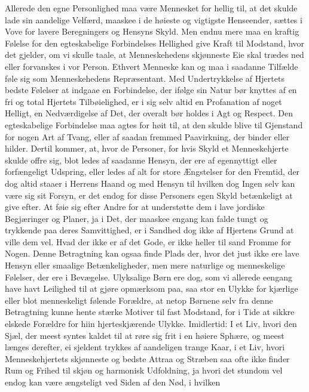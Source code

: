 \documentclass[12pt,a4paper]{book}
\newcommand{\apage}[1]{\marginnote{\footnotesize\textit{[#1]}}}
\begin{document}
Allerede den egne Personlighed maa være Mennesket for hellig til, at det
skulde lade sin aandelige Velfærd, maaskee i de høieste og vigtigste
Henseender, sættes i Vove for lavere Beregningers og Hensyns Skyld. Men
endnu mere maa en kraftig Følelse for \apage{152} den egteskabelige Forbindelses
Hellighed give Kraft til Modstand, hvor det gjelder, om vi skulle taale,
at Menneskehedens skjønneste Eie skal trædes ned eller forvanskes i vor
Person. Ethvert Menneske kan og maa i saadanne Tilfælde føle sig som
Menneskehedens Repræsentant.
Med Undertrykkelse af Hjertets bedste Følelser at indgaae en Forbindelse,
der ifølge sin Natur bør knyttes af en fri og total Hjertets
Tilbøielighed, er i sig selv altid en Profanation af noget Helligt, en
Nedværdigelse af Det, der overalt bør holdes i Agt og Respect. Den
egteskabelige Forbindelse maa agtes for høit til, at den skulde blive til
Gjenstand for nogen Art af Tvang, eller af saadan fremmed Paavirkning,
der binder eller hilder. Dertil kommer, at, hvor de Personer, for hvis
Skyld et Menneskehjerte skulde offre sig, blot ledes af saadanne Hensyn,
der ere af egennyttigt eller forfængeligt Udspring, eller ledes af alt
for store Ængstelser for den Fremtid, der dog altid staaer i Herrens
Haand og med Hensyn til hvilken dog Ingen selv kan være sig sit Forsyn,
er det endog for disse Personers egen Skyld betænkeligt at give efter. At
føie sig efter Andre for at understøtte dem i lave jordiske Begjæringer
og Planer, ja i Det, der maaskee engang kan falde tungt og trykkende paa
deres Samvittighed, er i Sandhed dog ikke af Hjertens Grund at ville dem
vel. Hvad der ikke er af det Gode, er ikke heller til sand Fromme for
Nogen. Denne Betragtning kan ogsaa finde Plads der, hvor det just \apage{153} ikke
ere lave Hensyn eller smaalige Betænkeligheder, men mere naturlige og
menneskelige Følelser, der ere i Bevægelse. Ulyksalige Børn ere dog, som
vi allerede eengang have havt Leilighed til at gjøre opmærksom paa, saa
stor en Ulykke for kjærlige eller blot menneskeligt følende Forældre, at
netop Børnene selv fra denne Betragtning kunne hente stærke Motiver til
fast Modstand, for i Tide at sikkre elskede Forældre for hiin
hjerteskjærende Ulykke. Imidlertid: I et Liv, hvori den Sjæl, der meest
syntes kaldet til at røre sig frit i en høiere Sphære, og meest længes
derefter, ei sjeldent trykkes af aandeligen trange Kaar, i et Liv, hvori
Menneskehjertets skjønneste og bedste Attraa og Stræben saa ofte ikke
finder Rum og Frihed til skjøn og harmonisk Udfoldning, ja hvori det
stundom vel endog kan være ængsteligt ved Siden af den Nød, i hvilken
\end{document}
